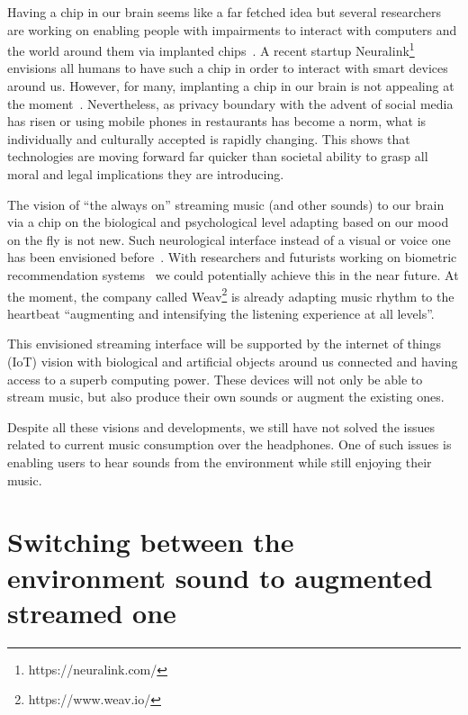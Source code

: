 \documentclass[manuscript,screen]{acmart}
\begin{document}
Having a chip in our brain seems like a far fetched idea but several researchers are working on enabling people with impairments to interact with computers and the world around them via implanted chips~\cite{santhanam2006high}. A recent startup Neuralink\footnote{https://neuralink.com/} envisions all humans to have such a chip in order to interact with smart devices around us. However, for many, implanting a chip in our brain is not appealing at the moment~\cite{metz2019chipbrain}. Nevertheless, as privacy boundary with the advent of social media has risen or using mobile phones in restaurants has become a norm, what is individually and culturally accepted is rapidly changing. This shows that technologies are moving forward far quicker than societal ability to grasp all moral and legal implications they are introducing.

The vision of ``the always on'' streaming music (and other sounds) to our brain via a chip on the biological and psychological level adapting based on our mood on the fly is not new. Such neurological interface instead of a visual or voice one has been envisioned before~\cite{cherie2019bravenewworld}. With researchers and futurists working on biometric recommendation systems~\cite{zhang2018system} we could potentially achieve this in the near future. At the moment, the company called Weav\footnote{https://www.weav.io/} is already adapting music rhythm to the heartbeat ``augmenting and intensifying the listening experience at all levels''. 

This envisioned streaming interface will be supported by the internet of things (IoT) vision with biological and artificial objects around us connected \cite{weisman2004internet} and having access to a superb computing power. These devices will not only be able to stream music, but also produce their own sounds or augment the existing ones.  

Despite all these visions and developments, we still have not solved the issues related to current music consumption over the headphones. One of such issues is enabling users to hear sounds from the environment while still enjoying their music. 

\section{Switching between the environment sound to augmented streamed one}
\end{document}
